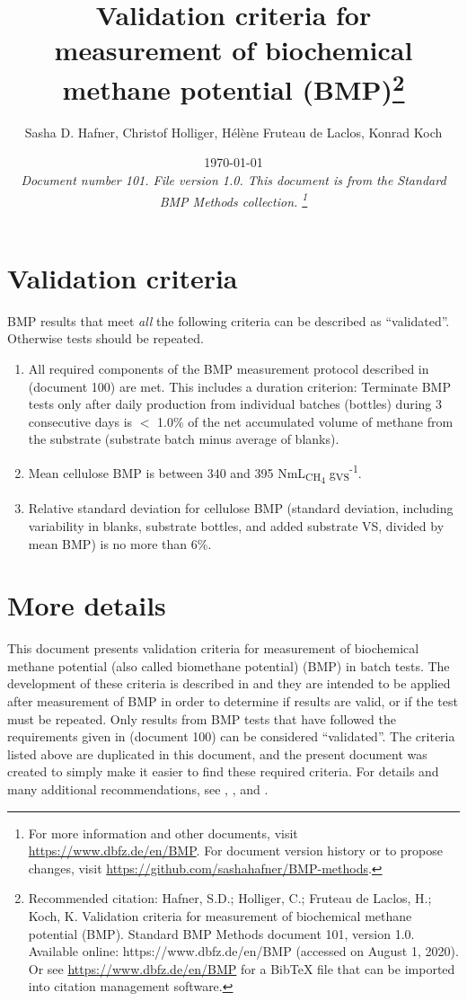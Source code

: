\documentclass[]{article}
\title {Validation criteria for measurement of biochemical methane potential (BMP)\footnote{
  Recommended citation: 
Hafner, S.D.; Holliger, C.; Fruteau de Laclos, H.; Koch, K. Validation criteria for measurement of biochemical methane potential (BMP). Standard BMP Methods document 101, version 1.0. Available online: https://www.dbfz.de/en/BMP (accessed on August 1, 2020).
\newline
  Or see \url{https://www.dbfz.de/en/BMP} for a BibTeX file that can be imported into citation management software.
}}
\author{
Sasha D. Hafner,
Christof Holliger,
H{\'e}l{\`e}ne Fruteau de Laclos,
Konrad Koch
}
\date{\today \\
\bigskip
\textit{
  Document number 101.
  File version 1.0. 
  This document is from the Standard BMP Methods collection.
    \footnote{For more information and other documents, visit \url{https://www.dbfz.de/en/BMP}. 
    For document version history or to propose changes, visit \url{https://github.com/sashahafner/BMP-methods}.}
}
}
\begin{document}
\maketitle

\section{Validation criteria}
\label{sec:crit}
BMP results that meet \textit{all} the following criteria can be described as ``validated''.
Otherwise tests should be repeated.

\begin{enumerate}
  \item All required components of the BMP measurement protocol described in \citet{BMPdoc100req} (document 100) are met. 
    This includes a duration criterion: Terminate BMP tests only after daily  production from individual batches (bottles) during 3 consecutive days is $<$ 1.0\% of the net accumulated volume of methane from the substrate (substrate batch minus average of blanks). 
  \item Mean cellulose BMP is between 340 and 395 NmL\textsubscript{CH\textsubscript{4}} g\textsubscript{VS}\textsuperscript{-1}.
  \item Relative standard deviation for cellulose BMP (standard deviation, including variability in blanks, substrate bottles, and added substrate VS, divided by mean BMP) is no more than 6\%.
\end{enumerate}


\section{More details}
This document presents validation criteria for measurement of biochemical methane potential (also called biomethane potential) (BMP) in batch tests.
The development of these criteria is described in \citet{hafnerImprovingInterlaboratoryReproducibility2020} and they are intended to be applied after measurement of BMP in order to determine if results are valid, or if the test must be repeated.
Only results from BMP tests that have followed the requirements given in \citet{BMPdoc100req} (document 100) can be considered ``validated''.
The criteria listed above are duplicated in this document, and the present document was created to simply make it easier to find these required criteria.
For details and many additional recommendations, see \citet{holligerStandardizationBiomethanePotential2016}, \citet{hafnerImprovingInterlaboratoryReproducibility2020}, and \citet{BMPdoc100req}.


\end{document}
